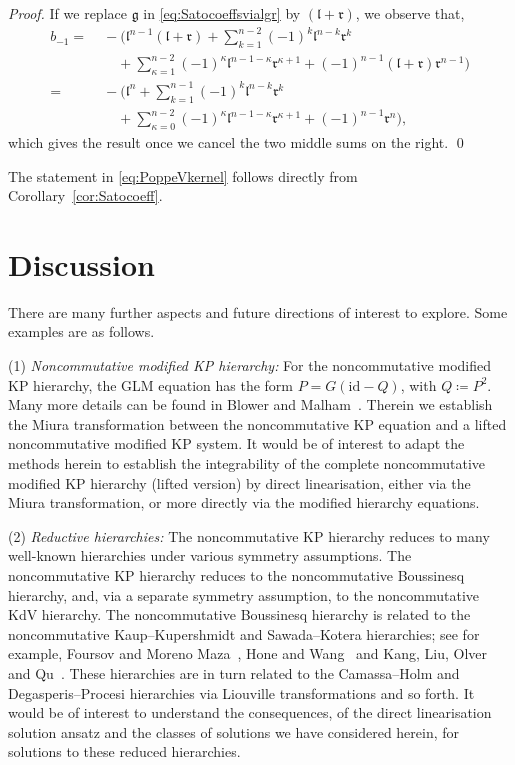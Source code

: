 \documentclass[5p,twocolumn]{elsarticle}
\newcommand*{\id}{{\mathrm{id}}}
\newcommand*{\el}{\mathfrak l}
\newcommand*{\gl}{\mathfrak g}
\newcommand*{\rl}{\mathfrak r}
\begin{document}
%
\begin{proof}
  If we replace $\gl$ in \eqref{eq:Satocoeffsvialgr} by $(\el+\rl)$, we observe that,
  \begin{align*}
    b_{-1}=&\;-\biggl(\el^{n-1}(\el+\rl)+\sum_{k=1}^{n-2}(-1)^k\el^{n-k}\rl^k\\
           &\;\quad+\sum_{\kappa=1}^{n-2}(-1)^{\kappa}\el^{n-1-\kappa}\rl^{\kappa+1}+(-1)^{n-1}(\el+\rl)\rl^{n-1}\biggr)\\
          =&\;-\biggl(\el^{n}+\sum_{k=1}^{n-1}(-1)^k\el^{n-k}\rl^k\\
           &\;\quad+\sum_{\kappa=0}^{n-2}(-1)^{\kappa}\el^{n-1-\kappa}\rl^{\kappa+1}+(-1)^{n-1}\rl^{n}\biggr),    
  \end{align*}
  which gives the result once we cancel the two middle sums on the right.
\qed
\end{proof}
%
The statement in \eqref{eq:PoppeVkernel} follows directly from Corollary~\ref{cor:Satocoeff}.
%





\section{Discussion}\label{sec:discussion}
There are many further aspects and future directions of interest to explore.
Some examples are as follows.

(1) \emph{Noncommutative modified KP hierarchy:} For the noncommutative modified KP hierarchy, the GLM equation has the form $P=G(\id-Q)$, with $Q\coloneqq P^2$.
Many more details can be found in Blower and Malham~\cite{BM-KP}.
Therein we establish the Miura transformation between the noncommutative KP equation and a lifted noncommutative modified KP system.
It would be of interest to adapt the methods herein to establish the integrability of the complete noncommutative modified KP hierarchy (lifted version) by direct linearisation,
either via the Miura transformation, or more directly via the modified hierarchy equations.

(2) \emph{Reductive hierarchies:} The noncommutative KP hierarchy reduces to many well-known hierarchies under various symmetry assumptions.
The noncommutative KP hierarchy reduces to the noncommutative Boussinesq hierarchy, and, via a separate symmetry assumption, to the noncommutative KdV hierarchy.
The noncommutative Boussinesq hierarchy is related to the noncommutative Kaup--Kupershmidt and Sawada--Kotera hierarchies; see for example,
Foursov and Moreno Maza~\cite{FM}, Hone and Wang~\cite{HW} and Kang, Liu, Olver and Qu~\cite{KLOQ}.
These hierarchies are in turn related to the Camassa--Holm and Degasperis--Procesi hierarchies via Liouville transformations and so forth.
It would be of interest to understand the consequences, of the direct linearisation solution ansatz and the classes of solutions we have considered herein, for solutions to these reduced hierarchies.
\end{document}
